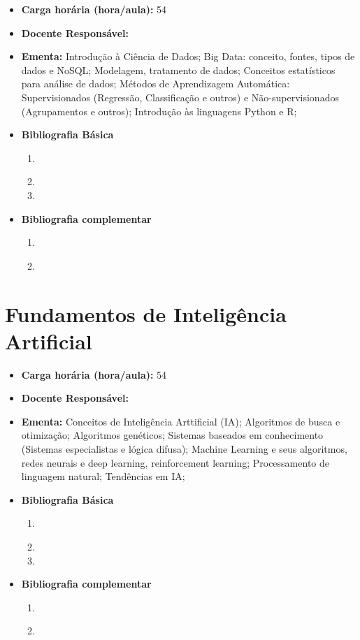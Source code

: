 \documentclass[11pt,fleqn]{book} %
\begin{document}
\begin{itemize}
	\item \textbf{Carga horária (hora/aula):} 54
	\item \textbf{Docente Responsável:}~
	\item \textbf{Ementa:} 
	Introdução à Ciência de Dados;
	Big Data: conceito, fontes, tipos de dados e NoSQL;
	Modelagem, tratamento de dados;
	Conceitos estatísticos para análise de dados;
	Métodos de Aprendizagem Automática: Supervisionados (Regressão, Classificação e outros) e Não-supervisionados (Agrupamentos e outros);
	Introdução às linguagens Python e R;
	\item \textbf{Bibliografia Básica}
	\begin{enumerate}
		\item \cite{barbetta2004estatistica}
		\item 
		\item 
	\end{enumerate}
	\item \textbf{Bibliografia complementar}
	\begin{enumerate}
		\item \cite{farberestatistica}
		\item
	\end{enumerate} 	
\end{itemize}



\newpage
\section{Fundamentos de Inteligência Artificial}\label{disc:ia}

\begin{itemize}
	\item \textbf{Carga horária (hora/aula):} 54
	\item \textbf{Docente Responsável:}~
	\item \textbf{Ementa:} 
	Conceitos de Inteligência Arttificial (IA);
	Algoritmos de busca e otimização;
	Algoritmos genéticos;
	Sistemas baseados em conhecimento (Sistemas especialistas e lógica difusa);
	Machine Learning e seus algoritmos, redes neurais e deep learning, reinforcement learning;
	Processamento de linguagem natural; 
	Tendências em IA;
	\item \textbf{Bibliografia Básica}
	\begin{enumerate}
		\item \cite{barbetta2004estatistica}
		\item 
		\item 
	\end{enumerate}
	\item \textbf{Bibliografia complementar}
	\begin{enumerate}
		\item \cite{farberestatistica}
		\item
	\end{enumerate} 	
\end{itemize}
\end{document}
